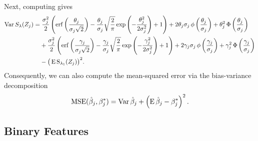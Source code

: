 Next, computing  gives
\begin{align}
  \label{eq:mean-centered-variance}
  \var{S_\lambda(Z_j)} & = \frac{\sigma_j^2}{2} \left( \erf\left(\frac{\theta_j}{\sigma_j\sqrt{2}}\right) - \frac{\theta_j}{\sigma_j}\sqrt{\frac{2}{\pi}} \exp\left(-\frac{\theta_j^2}{2\sigma_j^2}\right) + 1 \right) + 2 \theta_j \sigma_j \pdf \left(\frac{\theta_j}{\sigma_j}\right) + \theta_j^2 \cdf\left(\frac{\theta_j}{\sigma_j}\right) \nonumber               \\
                       & \phantom{={}} + \frac{\sigma_j^2}{2} \left( \erf\left(\frac{\gamma_j}{\sigma_j\sqrt{2}}\right) - \frac{\gamma_j}{\sigma_j}\sqrt{\frac{2}{\pi}} \exp\left(-\frac{\gamma_j^2}{2\sigma_j^2}\right) + 1 \right) + 2 \gamma_j \sigma_j \pdf \left(\frac{\gamma_j}{\sigma_j}\right) + \gamma_j^2 \cdf\left(\frac{\gamma_j}{\sigma_j}\right) \nonumber \\
                       & \phantom{={}} - \big(\E \st_{\lambda_1}({Z_j})\big)^2.
\end{align}
Consequently, we can also
compute the mean-squared error via the bias-variance decomposition
\begin{equation*}
  \label{eq:betahat-mse}
  \operatorname{MSE} (\hat\beta_j, \beta^*_j) = \operatorname{Var}\hat\beta_j + \left(\operatorname{E} \hat\beta_j - \beta^*_j\right)^2.
\end{equation*}

\subsection{Binary Features}\label{sec:theory-binary-features}

